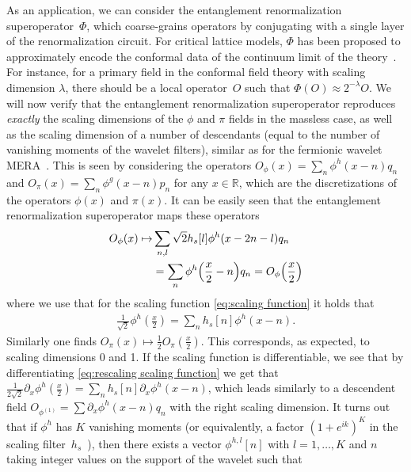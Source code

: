 \documentclass[submission, Phys]{SciPost}
\theoremstyle{definition}
\theoremstyle{remark}
\newcommand{\RR}{\mathbb R}
\begin{document}
As an application, we can consider the entanglement renormalization superoperator~$\Phi$, which coarse-grains operators by conjugating with a single layer of the renormalization circuit.
For critical lattice models, $\Phi$ has been proposed to approximately encode the conformal data of the continuum limit of the theory~\cite{evenbly2013quantum}.
For instance, for a primary field in the conformal field theory with scaling dimension $\lambda$, there should be a local operator~$O$ such that $\Phi(O) \approx 2^{-\lambda} O$.
We will now verify that the entanglement renormalization superoperator reproduces \emph{exactly} the scaling dimensions of the $\phi$ and $\pi$ fields in the massless case, as well as the scaling dimension of a number of descendants (equal to the number of vanishing moments of the wavelet filters), similar as for the fermionic wavelet MERA~\cite{evenbly2016entanglement,witteveen2019quantum}.
This is seen by considering the operators $O_{\phi}(x) = \sum_n \phi^h(x - n)q_n$ and $O_{\pi}(x) = \sum_n \phi^g(x - n)p_n$ for any $x \in \RR$, which are the discretizations of the operators $\phi(x)$ and $\pi(x)$.
It can be easily seen that the entanglement renormalization superoperator maps these operators
\begin{equation*}\begin{aligned}
   O_{\phi}(x) \mapsto& \sum_{n, l} \sqrt{2}h_s[l]\phi^h(x - 2n - l)q_n\\
   &= \sum_n \phi^h\Bigl(\frac{x}{2} - n\Bigr) q_n = O_{\phi}\Bigl(\frac{x}{2}\Bigr)
\end{aligned}\end{equation*}
where we use that for the scaling function \cref{eq:scaling function} it holds that~\cite{mallat2008wavelet}
\begin{align}\label{eq:rescaling scaling function}
   \frac{1}{\sqrt2}\phi^h(\frac{x}{2}) = \sum_n h_s[n]\phi^h(x - n).
\end{align}
Similarly one finds $O_{\pi}(x) \mapsto  \frac{1}{2}O_{\pi}(\frac{x}{2})$.
This corresponds, as expected, to scaling dimensions 0 and 1.
If the scaling function is differentiable, we see that by differentiating \cref{eq:rescaling scaling function} we get that $\frac{1}{2\sqrt2}\partial_x\phi^h(\frac{x}{2}) = \sum_n h_s[n]\partial_x\phi^h(x - n)$, which leads similarly to a descendent field $O_{\phi^{(1)}} = \sum \partial_x\phi^{h}(x - n)q_n$ with the right scaling dimension.
It turns out that if $\phi^h$ has $K$ vanishing moments (or equivalently, a factor $(1 + e^{ik})^K$ in the scaling filter~$h_s$~\cite{mallat2008wavelet}), then there exists a vector $\phi^{h,l}[n]$ with $l = 1, \ldots, K$ and $n$ taking integer values on the support of the wavelet such that
\end{document}
